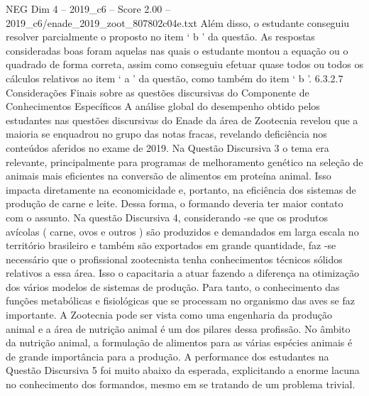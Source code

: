 \begin{textsample}{NEG Dim 4 – 2019\_c6 – Score 2.00 – 2019\_c6/enade\_2019\_zoot\_807802c04e.txt}
Além disso, o estudante conseguiu resolver parcialmente o proposto no item ‘ b ’ da questão.
As respostas consideradas boas foram aquelas nas quais o estudante montou a equação ou o quadrado de forma correta, assim como conseguiu efetuar quase todos ou todos os cálculos relativos ao item ‘ a ’ da questão, como também do item ‘ b ’. 6.3.2.7 Considerações Finais sobre as questões discursivas do Componente de Conhecimentos Específicos A análise global do desempenho obtido pelos estudantes nas questões discursivas do Enade da área de Zootecnia revelou que a maioria se enquadrou no grupo das notas fracas, revelando deficiência nos conteúdos aferidos no exame de 2019.
Na Questão Discursiva 3 o tema era relevante, principalmente para programas de melhoramento genético na seleção de animais mais eficientes na conversão de alimentos em proteína animal.
Isso impacta diretamente na economicidade e, portanto, na eficiência dos sistemas de produção de carne e leite.
Dessa forma, o formando deveria ter maior contato com o assunto.
Na questão Discursiva 4, considerando -se que os produtos avícolas ( carne, ovos e outros ) são produzidos e demandados em larga escala no território brasileiro e também são exportados em grande quantidade, faz -se necessário que o profissional zootecnista tenha conhecimentos técnicos sólidos relativos a essa área.
Isso o capacitaria a atuar fazendo a diferença na otimização dos vários modelos de sistemas de produção.
Para tanto, o conhecimento das funções metabólicas e fisiológicas que se processam no organismo das aves se faz importante.
A Zootecnia pode ser vista como uma engenharia da produção animal e a área de nutrição animal é um dos pilares dessa profissão.
No âmbito da nutrição animal, a formulação de alimentos para as várias espécies animais é de grande importância para a produção.
A performance dos estudantes na Questão Discursiva 5 foi muito abaixo da esperada, explicitando a enorme lacuna no conhecimento dos formandos, mesmo em se tratando de um problema trivial.

\end{textsample}
